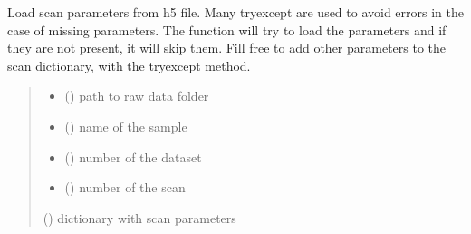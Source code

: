 \documentclass[letterpaper,10pt,english]{sphinxmanual}
\begin{document}

\begin{fulllineitems}
\label{\detokenize{index:ID10_tools.load_scan}}
\pysigstartsignatures
\pysiglinewithargsret
{}
{\sphinxparamcomma {}\sphinxparamcomma {}\sphinxparamcomma {}}
{}
\pysigstopsignatures
\sphinxAtStartPar
Load scan parameters from h5 file. Many try\sphinxhyphen{}except are used to avoid errors in the case of missing parameters. The function will try to load the parameters and if they are not present, it will skip them.
Fill free to add other parameters to the scan dictionary, with the try\sphinxhyphen{}except method.
\begin{quote}\begin{description}
\begin{itemize}
\item {} 
\sphinxAtStartPar
{} () \textendash{} path to raw data folder

\item {} 
\sphinxAtStartPar
{} () \textendash{} name of the sample

\item {} 
\sphinxAtStartPar
{} () \textendash{} number of the dataset

\item {} 
\sphinxAtStartPar
{} () \textendash{} number of the scan

\end{itemize}

\sphinxAtStartPar
{} () \textendash{} dictionary with scan parameters

\end{description}\end{quote}

\end{fulllineitems}

\end{document}
